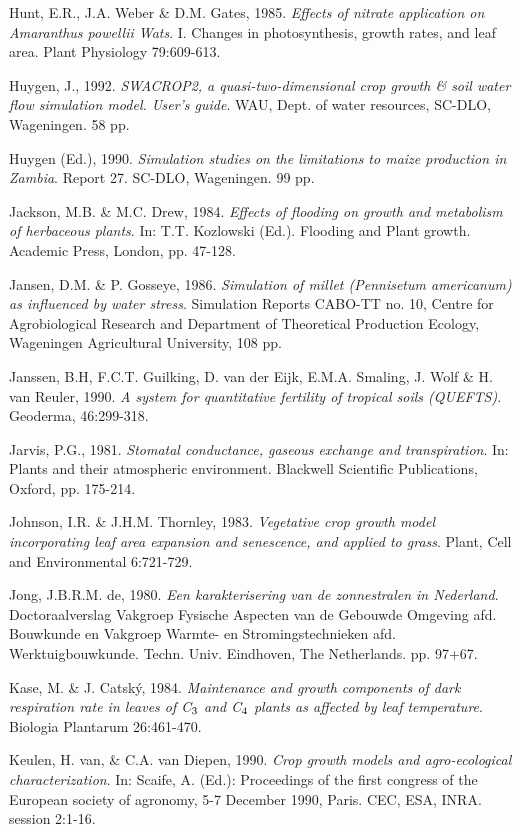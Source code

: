 Hunt, E.R., J.A. Weber \& D.M. Gates, 1985. {\it Effects of nitrate application on Amaranthus powellii
Wats\/}. I. Changes in photosynthesis, growth rates, and leaf area. Plant Physiology 79:609-613.

Huygen, J., 1992. {\it SWACROP2, a quasi-two-dimensional crop growth \& soil water flow simulation
model. User's guide\/}. WAU, Dept. of water resources, SC-DLO, Wageningen. 58 pp.

Huygen (Ed.), 1990. {\it Simulation studies on the limitations to maize production in Zambia\/}. Report 27.
SC-DLO, {\nobreak}Wageningen. 99 pp.

Jackson, M.B. \& M.C. Drew, 1984. {\it Effects of flooding on growth and metabolism of herbaceous
plants\/}. In: T.T. Kozlowski (Ed.). Flooding and Plant growth. Academic Press, London, pp. 47-128.

Jansen, D.M. \& P. Gosseye, 1986. {\it Simulation of millet (Pennisetum americanum) as influenced by
water stress\/}. Simulation Reports CABO-TT no. 10, Centre for Agrobiological Research and
Department of Theoretical Production Ecology, Wageningen Agricultural University, 108 pp.

Janssen, B.H, F.C.T. Guilking, D. van der Eijk, E.M.A. Smaling, J. Wolf \& H. van Reuler, 1990.
{\it A system for quantitative fertility of tropical soils (QUEFTS)\/}. Geoderma, 46:299-318.

Jarvis, P.G., 1981. {\it Stomatal conductance, gaseous exchange and transpiration\/}. In: Plants and their
atmospheric environment. Blackwell Scientific Publications, Oxford, pp. 175-214.

Johnson, I.R. \& J.H.M. Thornley, 1983. {\it Vegetative crop growth model incorporating leaf area
expansion and senescence, and applied to grass\/}. Plant, Cell and Environmental 6:721-729.

Jong, J.B.R.M. de, 1980. {\it Een karakterisering van de zonnestralen in Nederland\/}. Doctoraalverslag
Vakgroep Fysische Aspecten van de Gebouwde Omgeving afd. Bouwkunde en Vakgroep Warmte-
en Stromingstechnieken afd. Werktuigbouwkunde. Techn. Univ. Eindhoven, The Netherlands. pp.
97+67.

Kase, M. \& J. Catsk\'{y}, 1984. {\it Maintenance and growth components of dark respiration rate in leaves
of C$_{{\rm 3}}$ and C$_{{\rm 4}}$ plants as affected by leaf temperature\/}. Biologia Plantarum 26:461-470.

Keulen, H. van, \& C.A. van Diepen, 1990. {\it Crop growth models and agro-ecological charac\-terizati\-on\/}. 
In: Scaife, A. (Ed.): Proceedings of the first con\-gress of the European so\-cie\-ty of agronomy, 5-7
December 1990, Paris. CEC, ESA, INRA. session 2:1-16.

